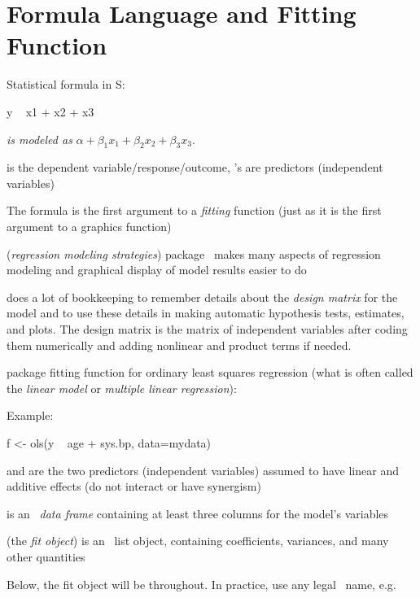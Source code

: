 \section{Formula Language and Fitting Function}%
\bi
\item Statistical formula in S:
\begin{Schunk}
\begin{Sinput}
y ~ x1 + x2 + x3
\end{Sinput}
\end{Schunk}
 \emph{is modeled as} $\alpha + \beta_{1}x_{1} + \beta_{2}x_{2}
+ \beta_{3} x_{3}$.
\item {} is the dependent variable/response/outcome, 's are
  predictors (independent variables)
\item The formula is the first argument to a \emph{fitting}
  function (just as it is the first argument to a 
  graphics function)
\item {} (\emph{regression modeling strategies}) package~\cite{rrms}
  makes many aspects of regression modeling
  and graphical display of model results easier to do
\item {} does a lot of bookkeeping to
  remember details about the \emph{design matrix} for the model and to
  use these details in making automatic hypothesis tests, estimates,
  and plots.  The design matrix is the matrix of independent variables
  after coding them numerically and adding nonlinear and product terms
  if needed.
\item {} package fitting function for ordinary least squares
  regression (what is often called the \emph{linear model} or
  \emph{multiple linear regression}): 
\item Example:\ipacue
\begin{Schunk}
\begin{Sinput}
f <- ols(y ~ age + sys.bp, data=mydata)
\end{Sinput}
\end{Schunk}
\item {} and  are the two predictors (independent
variables) assumed to have linear and additive effects (do not
interact or have synergism)
\item {} is an \R\ \emph{data frame} containing at least
  three columns for the model's variables
\item {} (the \emph{fit object}) is an \R\ list object, containing
  coefficients, variances, and many other quantities
\item Below, the fit object will be  throughout.  In practice,
  use any legal \R\  name, e.g. 
\ei

